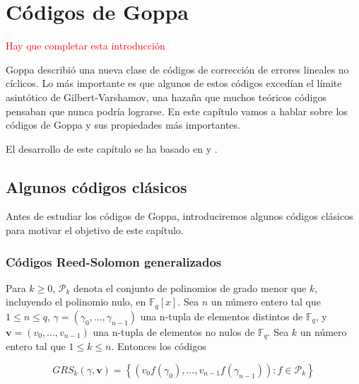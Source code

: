 
\chapter{Códigos de Goppa}

\textcolor{red}{Hay que completar esta introducción}

Goppa describió una nueva clase de códigos de corrección de errores lineales no cíclicos. Lo más importante es que algunos de estos códigos excedían el límite asintótico de Gilbert-Varshamov, una hazaña que muchos teóricos códigos pensaban que nunca podría lograrse. En este capítulo vamos a hablar sobre los códigos de Goppa y sus propiedades más importantes.


El desarrollo de este capítulo se ha basado en \cite{Huffman_Pless_2010} y \cite{Goppa_codes_1973}.

\section{Algunos códigos clásicos}

Antes de estudiar los códigos de Goppa, introduciremos algunos códigos clásicos para motivar el objetivo de este capítulo.

\subsection{Códigos Reed-Solomon generalizados}

Para $k \geq 0$, $\mathcal{P}_k$ denota el conjunto de polinomios de grado menor que $k$, incluyendo el polinomio nulo, en $\mathbb{F}_q[x]$. Sea $n$ un número entero tal que $1 \leq n \leq q$, $\gamma = (\gamma _0,..., \gamma _{n-1})$ una n-tupla de elementos distintos de $\mathbb{F}_q$, y $\textbf{v} = (v_0,...,v_{n-1})$ una n-tupla de elementos no nulos de $\mathbb{F}_q$. Sea $k$ un número entero tal que $1 \leq k \leq n$. Entonces los códigos

$$GRS_k (\gamma, \textbf{v}) = \left\{ \left( v_0 f(\gamma_0), ..., v_{n-1}f(\gamma_{n-1}) \right) : f \in \mathcal{P}_k \right\}$$

